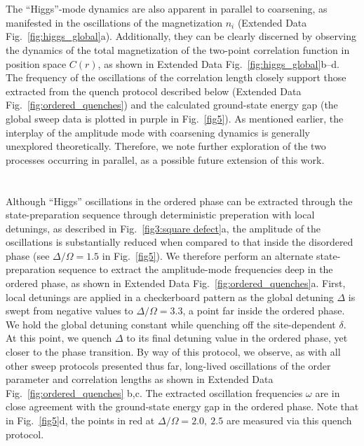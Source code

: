 \documentclass[reprint,twocolumn,secnumarabic,amssymb, aps, prx]{revtex4-2}
\begin{document}
 \\
\\
The ``Higgs''-mode dynamics are also apparent in parallel to coarsening, as manifested in the oscillations of the magnetization $n_i$ (Extended Data Fig.~\ref{fig:higgs_global}a). Additionally, they can be clearly discerned by observing the dynamics of the total magnetization of the two-point correlation function in position space $C(r)$, as shown in Extended Data Fig.~\ref{fig:higgs_global}b--d. The frequency of the oscillations of the correlation length closely support those extracted from the quench protocol described below (Extended Data Fig.~\ref{fig:ordered_quenches}) and the calculated ground-state energy gap (the global sweep data is plotted in purple in Fig.~\ref{fig5}). As mentioned earlier, the interplay of the amplitude mode with coarsening dynamics is generally unexplored theoretically. Therefore, we note further exploration of the two processes occurring in parallel, as a possible future extension of this work. \\

\\
\\
Although ``Higgs'' oscillations in the ordered phase can be extracted through the state-preparation sequence through deterministic preperation with local detunings, as described in Fig.~\ref{fig3:square defect}a, the amplitude of the oscillations is substantially reduced when compared to that inside the disordered phase (see $\Delta/\Omega = 1.5$ in Fig.~\ref{fig5}). We therefore perform an alternate state-preparation sequence to extract the amplitude-mode frequencies deep in the ordered phase, as shown in Extended Data Fig.~\ref{fig:ordered_quenches}a. First, local detunings are applied in a checkerboard pattern  as the global detuning $\Delta$ is swept from negative values to $\Delta/\Omega = 3.3$, a point far inside the ordered phase. We hold the global detuning constant while quenching off the site-dependent $\delta$. At this point, we quench $\Delta$ to its final detuning value in the ordered phase, yet closer to the phase transition. By way of this protocol, we observe, as with all other sweep protocols presented thus far, long-lived oscillations of the order parameter and correlation lengths as shown in Extended Data Fig.~\ref{fig:ordered_quenches} b,c. The extracted oscillation frequencies $\omega$ are in close agreement with the ground-state energy gap in the ordered phase. Note that in Fig.~\ref{fig5}d, the points in red at $\Delta/\Omega  = 2.0,~2.5$ are measured via this quench protocol. \\
\end{document}
